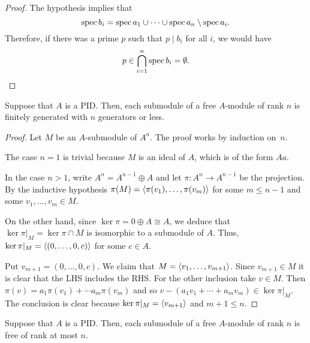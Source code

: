 \begin{proof}\label{prop:relative-prime-combination}
    The hypothesis implies that
    $$
        \operatorname{spec}b_i = \operatorname{spec}a_1 \cup \cdots \cup \operatorname{spec}a_n \setminus \operatorname{spec}a_i.
    $$
    Therefore, if there was a prime\/ $p$ such that\/ $p \mid b_i$ for all\/ $i$, we would have
    $$
        p \in \bigcap_{i=1}^n \operatorname{spec}b_i = \emptyset.
    $$
\end{proof}


\begin{thm}
    Suppose that\/ $A$ is a PID. Then, each submodule of a free\/ $A$-module of rank\/ $n$ is finitely generated with\/ $n$ generators or less.
\end{thm}

\begin{proof}
    Let $M$ be an $A$-submodule of $A^n$. The proof works by induction on~$n$.

    The case $n=1$ is trivial because $M$ is an ideal of $A$, which is of the form $Aa$.

    In the case $n>1$, write $A^n=A^{n-1}\oplus A$ and let $\pi\colon A^n\to A^{n-1}$ be the projection. By the inductive hypothesis $\pi(M)=\langle\pi(v_1),\dots,\pi(v_m)\rangle$ for some $m\le n-1$ and some $v_1,\dots,v_m\in M$.

    On the other hand, since $\ker\pi=0\oplus A\cong A$, we deduce that $\ker\pi|_M=\ker\pi\cap M$ is isomorphic to a submodule of $A$. Thus, $\ker\pi|_M=\langle(0,\dots,0,c)\rangle$ for some $c\in A$.

    Put $v_{m+1}=(0,\dots,0,c)$. We claim that $M=\langle v_1,\dots,v_{m+1}\rangle$. Since $v_{m+1}\in M$ it is clear that the LHS includes the RHS. For the other inclusion take $v\in M$. Then $\pi(v)=a_1\pi(v_1)+\cdots a_m\pi(v_m)$ and so $v-(a_1v_1+\cdots+a_mv_m)\in\ker\pi|_M$. The conclusion is clear because $\ker\pi|_M=\langle v_{m+1}\rangle$ and $m+1\le n$.
\end{proof}

\begin{thm}\label{thm:pid-submodule-of-free-is-free}
    Suppose that\/ $A$ is a PID. Then, each submodule of a free\/ $A$-module of rank\/ $n$ is free of rank at most\/ $n$.
\end{thm}

